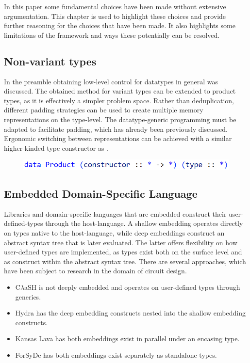 \documentclass{article}
\newcommand{\type}[1]{\smash{\colorbox{codegray}{\texttt{#1}}}}
\begin{document}
In this paper some fundamental choices have been made without extensive argumentation.
This chapter is used to highlight these choices and provide further reasoning for the choices that have been made.
It also highlights some limitations of the framework and ways these potentially can be resolved.

\subsection{Non-variant types}

In the preamble obtaining low-level control for datatypes in general was discussed.
The obtained method for variant types can be extended to product types, as it is effectively a simpler problem space.
Rather than deduplication, different padding strategies can be used to create multiple memory representations on the type-level.
The datatype-generic programming must be adapted to facilitate padding, which has already been previously discussed.
Ergonomic switching between representations can be achieved with a similar higher-kinded type constructor as \type{Variant}.

\begin{figure}[hbt!]
    \hspace{1em}
    \includegraphics[scale=0.4]{Discussion1.png}
\end{figure}
\vspace{-1em}

\subsection{Embedded Domain-Specific Language}

Libraries and domain-specific languages that are embedded construct their user-defined-types through the host-language.
A shallow embedding operates directly on types native to the host-language, while deep embeddings construct an abstract syntax tree that is later evaluated.
The latter offers flexibility on how user-defined types are implemented, as types exist both on the surface level and as construct within the abstract syntax tree.   
There are several approaches, which have been subject to research in the domain of circuit design.

\begin{itemize}
    \setlength\itemsep{0em}
    \item {C$\lambda$aSH} is not deeply embedded and operates on user-defined types through generics\cite{clash}. 
    \item Hydra has the deep embedding constructs nested into the shallow embedding constructs\cite{hydra}.
    \item Kansas Lava has both embeddings exist in parallel under an encasing type\cite{kansas-lava}.
    \item ForSyDe has both embeddings exist separately as standalone types\cite{forsyde}.
\end{itemize}
\end{document}
